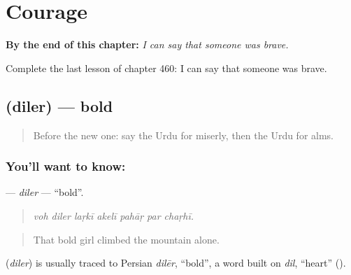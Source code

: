 
\chapter{Courage}
\label{ch:ur-courage}

\begin{chapteropening}
\textbf{By the end of this chapter:} \emph{I can say that someone was brave.}

Complete the last lesson of chapter 460: I can say that someone was brave.
\end{chapteropening}

\section[\texorpdfstring{\ur{دلیر} (diler)}{دلیر (diler)}]{ (diler) — bold}

\label{lesson:UR-C460-diler}



\begin{quote}
Before the new one: say the Urdu for miserly, then the Urdu for alms.
\end{quote}

\subsection*{You'll want to know: }
\textbf{} — \emph{diler} — \textquotedblleft{}bold\textquotedblright{}.

\begin{quote}
      
\end{quote}

\begin{quote}
\emph{voh diler laṛkī akelī pahāṛ par chaṛhī.}
\end{quote}

\begin{quote}
That bold girl climbed the mountain alone.
\end{quote}

\begin{cousinweb}
\textbf{} (\emph{diler}) is usually traced to Persian \emph{dilēr}, \textquotedblleft{}bold\textquotedblright{}, a word built on \emph{dil}, \textquotedblleft{}heart\textquotedblright{} (\textbf{}).
\end{cousinweb}

